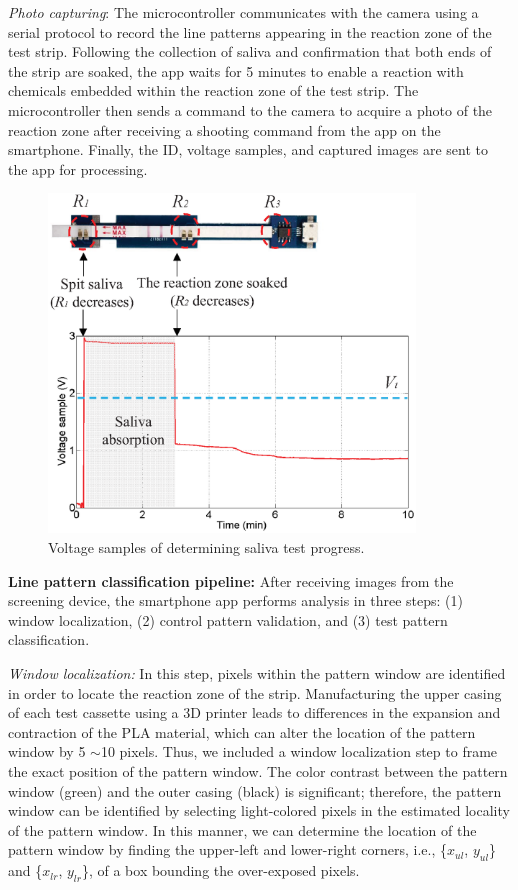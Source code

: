 \emph{Photo capturing}: The microcontroller communicates with the camera using a serial protocol to record the line patterns appearing in the reaction zone of the test strip. Following the collection of saliva and confirmation that both ends of the strip are soaked, the app waits for 5 minutes to enable a reaction with chemicals embedded within the reaction zone of the test strip. The microcontroller then sends a command to the camera to acquire a photo of the reaction zone after receiving a shooting command from the app on the smartphone. 
Finally, the ID, voltage samples, and captured images are sent to the app for processing.

\begin{figure}[ht]
\begin{center}
\includegraphics[height=9cm]{image/ket/saliva_absorb.eps}
\caption{Voltage samples of determining saliva test progress.}
\label{fig:saliva_absorb}
\end{center}
\end{figure}


\textbf{Line pattern classification pipeline:}
\newline
After receiving images from the screening device, the smartphone app performs analysis in three steps: (1) window localization, (2) control pattern validation, and (3) test pattern classification.

\emph{Window localization: }
In this step, pixels within the pattern window are identified in order to locate the reaction zone of the strip. Manufacturing the upper casing of each test cassette using a 3D printer leads to differences in the expansion and contraction of the PLA material, which can alter the location of the pattern window by 5 $\sim$10 pixels. Thus, we included a window localization step to frame the exact position of the pattern window. The color contrast between the pattern window (green) and the outer casing (black) is significant; therefore, the pattern window can be identified by selecting light-colored pixels in the estimated locality of the pattern window. In this manner, we can determine the location of the pattern window by finding the upper-left and lower-right corners, i.e., \{$x_{ul}$, $y_{ul}$\} and \{$x_{lr}$, $y_{lr}$\}, of a box bounding the over-exposed pixels.

